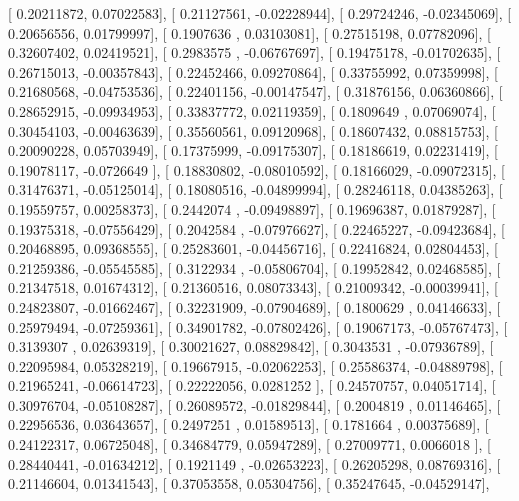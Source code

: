 \documentclass{article}
\begin{document}
       [ 0.20211872,  0.07022583],
       [ 0.21127561, -0.02228944],
       [ 0.29724246, -0.02345069],
       [ 0.20656556,  0.01799997],
       [ 0.1907636 ,  0.03103081],
       [ 0.27515198,  0.07782096],
       [ 0.32607402,  0.02419521],
       [ 0.2983575 , -0.06767697],
       [ 0.19475178, -0.01702635],
       [ 0.26715013, -0.00357843],
       [ 0.22452466,  0.09270864],
       [ 0.33755992,  0.07359998],
       [ 0.21680568, -0.04753536],
       [ 0.22401156, -0.00147547],
       [ 0.31876156,  0.06360866],
       [ 0.28652915, -0.09934953],
       [ 0.33837772,  0.02119359],
       [ 0.1809649 ,  0.07069074],
       [ 0.30454103, -0.00463639],
       [ 0.35560561,  0.09120968],
       [ 0.18607432,  0.08815753],
       [ 0.20090228,  0.05703949],
       [ 0.17375999, -0.09175307],
       [ 0.18186619,  0.02231419],
       [ 0.19078117, -0.0726649 ],
       [ 0.18830802, -0.08010592],
       [ 0.18166029, -0.09072315],
       [ 0.31476371, -0.05125014],
       [ 0.18080516, -0.04899994],
       [ 0.28246118,  0.04385263],
       [ 0.19559757,  0.00258373],
       [ 0.2442074 , -0.09498897],
       [ 0.19696387,  0.01879287],
       [ 0.19375318, -0.07556429],
       [ 0.2042584 , -0.07976627],
       [ 0.22465227, -0.09423684],
       [ 0.20468895,  0.09368555],
       [ 0.25283601, -0.04456716],
       [ 0.22416824,  0.02804453],
       [ 0.21259386, -0.05545585],
       [ 0.3122934 , -0.05806704],
       [ 0.19952842,  0.02468585],
       [ 0.21347518,  0.01674312],
       [ 0.21360516,  0.08073343],
       [ 0.21009342, -0.00039941],
       [ 0.24823807, -0.01662467],
       [ 0.32231909, -0.07904689],
       [ 0.1800629 ,  0.04146633],
       [ 0.25979494, -0.07259361],
       [ 0.34901782, -0.07802426],
       [ 0.19067173, -0.05767473],
       [ 0.3139307 ,  0.02639319],
       [ 0.30021627,  0.08829842],
       [ 0.3043531 , -0.07936789],
       [ 0.22095984,  0.05328219],
       [ 0.19667915, -0.02062253],
       [ 0.25586374, -0.04889798],
       [ 0.21965241, -0.06614723],
       [ 0.22222056,  0.0281252 ],
       [ 0.24570757,  0.04051714],
       [ 0.30976704, -0.05108287],
       [ 0.26089572, -0.01829844],
       [ 0.2004819 ,  0.01146465],
       [ 0.22956536,  0.03643657],
       [ 0.2497251 ,  0.01589513],
       [ 0.1781664 ,  0.00375689],
       [ 0.24122317,  0.06725048],
       [ 0.34684779,  0.05947289],
       [ 0.27009771,  0.0066018 ],
       [ 0.28440441, -0.01634212],
       [ 0.1921149 , -0.02653223],
       [ 0.26205298,  0.08769316],
       [ 0.21146604,  0.01341543],
       [ 0.37053558,  0.05304756],
       [ 0.35247645, -0.04529147],
\end{document}

